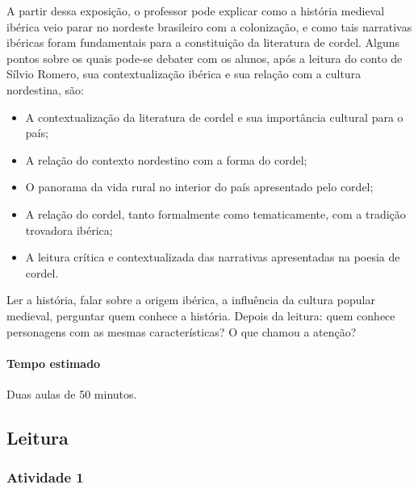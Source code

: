 \documentclass[11pt]{extarticle}
\begin{document}
A partir dessa exposição, o professor pode explicar como a história medieval ibérica veio parar no nordeste brasileiro com a colonização, e como tais narrativas ibéricas foram fundamentais para a constituição da literatura de cordel.
Alguns pontos sobre os quais pode-se debater com os alunos, após a leitura do conto de Sílvio Romero, sua contextualização ibérica e sua relação com a cultura nordestina, são:

\begin{itemize}
\item A contextualização da literatura de cordel e sua importância cultural para o país;

\item A relação do contexto nordestino com a forma do cordel;

\item O panorama da vida rural no interior do país apresentado pelo cordel;

\item A relação do cordel, tanto formalmente como tematicamente, com a tradição trovadora ibérica;

\item A leitura crítica e contextualizada das narrativas apresentadas na poesia de cordel.
\end{itemize}

Ler a história, falar sobre a origem ibérica, a influência da cultura popular medieval, perguntar quem conhece a história.
Depois da leitura: quem conhece personagens com as mesmas características? O que chamou a atenção?

\paragraph{Tempo estimado} Duas aulas de 50 minutos.



\subsection{Leitura}

\subsubsection{Atividade 1}

\end{document}
